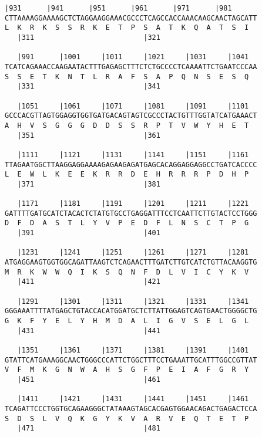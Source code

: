 \documentclass{article}
\begin{document}
\begin{Verbatim}[fontfamily=courier]
   |931      |941      |951      |961      |971      |981   
CTTAAAAGGAAAAGCTCTAGGAAGGAAACGCCCTCAGCCACCAAACAAGCAACTAGCATT
L  K  R  K  S  S  R  K  E  T  P  S  A  T  K  Q  A  T  S  I  
   |311                          |321                       

   |991      |1001     |1011     |1021     |1031     |1041  
TCATCAGAAACCAAGAATACTTTGAGAGCTTTCTCTGCCCCTCAAAATTCTGAATCCCAA
S  S  E  T  K  N  T  L  R  A  F  S  A  P  Q  N  S  E  S  Q  
   |331                          |341                       

   |1051     |1061     |1071     |1081     |1091     |1101  
GCCCACGTTAGTGGAGGTGGTGATGACAGTAGTCGCCCTACTGTTTGGTATCATGAAACT
A  H  V  S  G  G  G  D  D  S  S  R  P  T  V  W  Y  H  E  T  
   |351                          |361                       

   |1111     |1121     |1131     |1141     |1151     |1161  
TTAGAATGGCTTAAGGAGGAAAAGAGAAGAGATGAGCACAGGAGGAGGCCTGATCACCCC
L  E  W  L  K  E  E  K  R  R  D  E  H  R  R  R  P  D  H  P  
   |371                          |381                       

   |1171     |1181     |1191     |1201     |1211     |1221  
GATTTTGATGCATCTACACTCTATGTGCCTGAGGATTTCCTCAATTCTTGTACTCCTGGG
D  F  D  A  S  T  L  Y  V  P  E  D  F  L  N  S  C  T  P  G  
   |391                          |401                       

   |1231     |1241     |1251     |1261     |1271     |1281  
ATGAGGAAGTGGTGGCAGATTAAGTCTCAGAACTTTGATCTTGTCATCTGTTACAAGGTG
M  R  K  W  W  Q  I  K  S  Q  N  F  D  L  V  I  C  Y  K  V  
   |411                          |421                       

   |1291     |1301     |1311     |1321     |1331     |1341  
GGGAAATTTTATGAGCTGTACCACATGGATGCTCTTATTGGAGTCAGTGAACTGGGGCTG
G  K  F  Y  E  L  Y  H  M  D  A  L  I  G  V  S  E  L  G  L  
   |431                          |441                       

   |1351     |1361     |1371     |1381     |1391     |1401  
GTATTCATGAAAGGCAACTGGGCCCATTCTGGCTTTCCTGAAATTGCATTTGGCCGTTAT
V  F  M  K  G  N  W  A  H  S  G  F  P  E  I  A  F  G  R  Y  
   |451                          |461                       

   |1411     |1421     |1431     |1441     |1451     |1461  
TCAGATTCCCTGGTGCAGAAGGGCTATAAAGTAGCACGAGTGGAACAGACTGAGACTCCA
S  D  S  L  V  Q  K  G  Y  K  V  A  R  V  E  Q  T  E  T  P  
   |471                          |481                       

\end{Verbatim}
\end{document}
